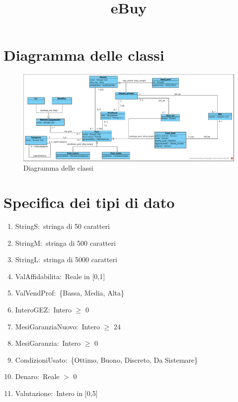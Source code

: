 \documentclass{article}
\title{eBuy}
\author{}
\date{}
\begin{document}
\maketitle

\tableofcontents

\newpage

\section{\label{sec:DiagrammaDelleClassi}Diagramma delle classi}
\begin{figure}[h]
    \centering
    \includegraphics[width=1\textwidth]{../Diagrammi/diagramma delle classi.pdf}
    \caption{Diagramma delle classi}
\end{figure}

\newpage
\section{\label{Sec:SpecificaTipoDiDato}Specifica dei tipi di dato}

\begin{enumerate}
    \item\label{sec:TipoStringS}StringS$: $ stringa di 50 caratteri
    \item\label{sec:TipoStringM}StringM$: $ stringa di 500 caratteri
    \item\label{sec:TipoStringL}StringL$: $ stringa di 5000 caratteri
    \item\label{sec:TipoValAffidabilita}ValAffidabilita$: $ Reale in [0,1]
    \item\label{sec:TipoValVendProf}ValVendProf$: $ \{Bassa, Media, Alta\}
    \item\label{sec:TipoInteroGEZ}InteroGEZ$: $ Intero $\geq$ 0
    \item\label{sec:TipoMesiGaranziaNuovo}MesiGaranziaNuovo$: $ Intero $\geq$ 24
    \item\label{sec:TipoMesiGaranzia}MesiGaranzia$: $ Intero $\geq$ 0
    \item\label{sec:TipoCondizioniUsato}CondizioniUsato$: $ \{Ottimo, Buono, Discreto, Da Sistemare\}
    \item\label{sec:TipoDenaro}Denaro$: $ Reale $>$ 0
    \item\label{sec:Valutazione}Valutazione$: $ Intero in [0,5]
\end{enumerate}
\end{document}

